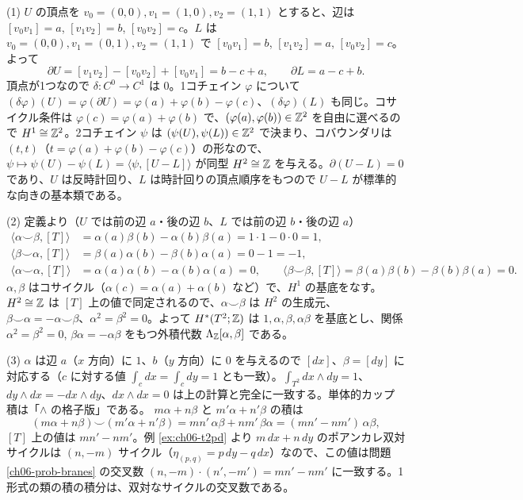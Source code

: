 \begin{solution}
(1) $U$ の頂点を $v_0=(0,0),v_1=(1,0),v_2=(1,1)$ とすると、辺は $[v_0v_1]=a$, $[v_1v_2]=b$, $[v_0v_2]=c$。$L$ は $v_0=(0,0),v_1=(0,1),v_2=(1,1)$ で $[v_0v_1]=b$, $[v_1v_2]=a$, $[v_0v_2]=c$。よって
\[
\partial U=[v_1v_2]-[v_0v_2]+[v_0v_1]=b-c+a,\qquad\partial L=a-c+b .
\]
頂点が1つなので $\delta\colon C^0\to C^1$ は $0$。1コチェイン $\varphi$ について $(\delta\varphi)(U)=\varphi(\partial U)=\varphi(a)+\varphi(b)-\varphi(c)$、$(\delta\varphi)(L)$ も同じ。コサイクル条件は $\varphi(c)=\varphi(a)+\varphi(b)$ で、$(\varphi(a),\varphi(b))\in\mathbb{Z}^2$ を自由に選べるので $H^1\cong\mathbb{Z}^2$。2コチェイン $\psi$ は $(\psi(U),\psi(L))\in\mathbb{Z}^2$ で決まり、コバウンダリは $(t,t)$（$t=\varphi(a)+\varphi(b)-\varphi(c)$）の形なので、$\psi\mapsto\psi(U)-\psi(L)=\langle\psi,[U-L]\rangle$ が同型 $H^2\cong\mathbb{Z}$ を与える。$\partial(U-L)=0$ であり、$U$ は反時計回り、$L$ は時計回りの頂点順序をもつので $U-L$ が標準的な向きの基本類である。

(2) 定義より（$U$ では前の辺 $a$・後の辺 $b$、$L$ では前の辺 $b$・後の辺 $a$）
\begin{align*}
\langle\alpha\smile\beta,[T]\rangle&=\alpha(a)\beta(b)-\alpha(b)\beta(a)=1\cdot1-0\cdot0=1,\\
\langle\beta\smile\alpha,[T]\rangle&=\beta(a)\alpha(b)-\beta(b)\alpha(a)=0-1=-1,\\
\langle\alpha\smile\alpha,[T]\rangle&=\alpha(a)\alpha(b)-\alpha(b)\alpha(a)=0,\qquad
\langle\beta\smile\beta,[T]\rangle=\beta(a)\beta(b)-\beta(b)\beta(a)=0.
\end{align*}
$\alpha,\beta$ はコサイクル（$\alpha(c)=\alpha(a)+\alpha(b)$ など）で、$H^1$ の基底をなす。$H^2\cong\mathbb{Z}$ は $[T]$ 上の値で同定されるので、$\alpha\smile\beta$ は $H^2$ の生成元、$\beta\smile\alpha=-\alpha\smile\beta$、$\alpha^2=\beta^2=0$。よって $H^*(T^2;\mathbb{Z})$ は $1,\alpha,\beta,\alpha\beta$ を基底とし、関係 $\alpha^2=\beta^2=0$, $\beta\alpha=-\alpha\beta$ をもつ外積代数 $\Lambda_{\mathbb{Z}}[\alpha,\beta]$ である。

(3) $\alpha$ は辺 $a$（$x$ 方向）に $1$、$b$（$y$ 方向）に $0$ を与えるので $[dx]$、$\beta=[dy]$ に対応する（$c$ に対する値 $\int_c dx=\int_c dy=1$ とも一致）。$\int_{T^2}dx\wedge dy=1$、$dy\wedge dx=-dx\wedge dy$、$dx\wedge dx=0$ は上の計算と完全に一致する。単体的カップ積は「$\wedge$ の格子版」である。
$m\alpha+n\beta$ と $m'\alpha+n'\beta$ の積は
\[
(m\alpha+n\beta)\smile(m'\alpha+n'\beta)=mn'\,\alpha\beta+nm'\,\beta\alpha=(mn'-nm')\,\alpha\beta,
\]
$[T]$ 上の値は $mn'-nm'$。例 \ref{ex:ch06-t2pd} より $m\,dx+n\,dy$ のポアンカレ双対サイクルは $(n,-m)$ サイクル（$\eta_{(p,q)}=p\,dy-q\,dx$）なので、この値は問題 \ref{ch06-prob-branes} の交叉数 $(n,-m)\cdot(n',-m')=mn'-nm'$ に一致する。1形式の類の積の積分は、双対なサイクルの交叉数である。
\end{solution}

